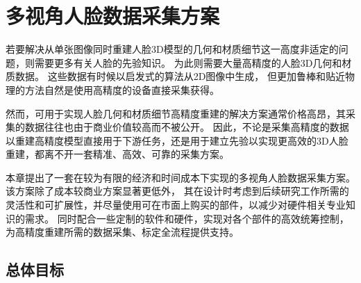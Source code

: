 \chapter{多视角人脸数据采集方案}
\label{chap:platform}

若要解决从单张图像同时重建人脸3D模型的几何和材质细节这一高度非适定的问题，则需要更多有关人脸的先验知识。
为此则需要大量高精度的人脸3D几何和材质数据。
这些数据有时候以启发式的算法从2D图像中生成，
但更加鲁棒和贴近物理的方法自然是使用高精度的设备直接采集获得。

然而，可用于实现人脸几何和材质细节高精度重建的解决方案通常价格高昂，其采集的数据往往也由于商业价值较高而不被公开。
因此，不论是采集高精度的数据以重建高精度模型直接用于下游任务，还是用于建立先验以实现更高效的3D人脸重建，都离不开一套精准、高效、可靠的采集方案。

本章提出了一套在较为有限的经济和时间成本下实现的多视角人脸数据采集方案。
该方案除了成本较商业方案显著更低外，
其在设计时考虑到后续研究工作所需的灵活性和可扩展性，并尽量使用可在市面上购买的部件，以减少对硬件相关专业知识的需求。
同时配合一些定制的软件和硬件，实现对各个部件的高效统筹控制，为高精度重建所需的数据采集、标定全流程提供支持。

\section{总体目标}

